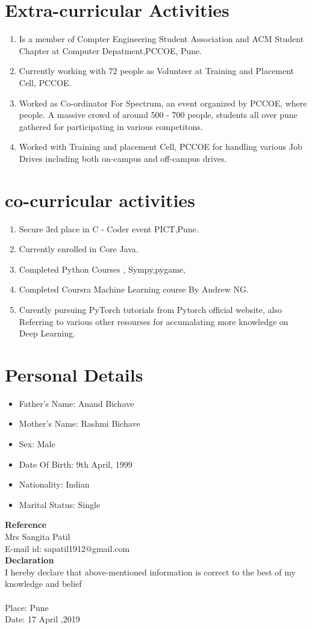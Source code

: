 \documentclass[5pt]{article}
\begin{document}
\section{Extra-curricular Activities}
\begin{enumerate}
\item Is a member of Compter Engineering Student Association and ACM Student Chapter at Computer Depatment,PCCOE, Pune.
\item Currently working with 72 people as Volunteer at Training and Placement Cell, PCCOE.
\item Worked as Co-ordinator For Spectrum, an event organized by PCCOE, where people.  A massive crowd of around 500 - 700 people, students all over pune gathered for participating in various competitons.
\item Worked with Training and placement Cell, PCCOE for handling various Job Drives including both on-campus and off-campus drives.
\end{enumerate}


\section{co-curricular activities}
\begin{enumerate}
\item Secure 3rd place in C - Coder event PICT,Pune.
\item Currently enrolled in Core Java.
\item Completed Python Courses , Sympy,pygame, 
\item Completed Coursra Machine Learning course By Andrew NG. 
\item Curently pursuing PyTorch tutorials from Pytorch official website, also Referring to various other resourses for accumalating more knowledge on Deep Learning.
\end{enumerate}


\section{Personal Details} 
\begin{itemize}

\item{Father's Name: Anand Bichave}
\item{Mother's Name: Rashmi Bichave}
\item{Sex: Male}
\item{Date Of Birth: 9th April, 1999}
\item{Nationality: Indian}
\item{Marital Status: Single}

\end{itemize}

\noindent
\textbf{Reference}
\\
Mrs Sangita Patil\\
E-mail id: sapatil1912@gmail.com\\

\noindent
\textbf{Declaration}
\\
I hereby declare that above-mentioned information is correct to the best of my knowledge and belief\\
\\
Place: Pune\\
Date: 17 April ,2019
\end{document}
